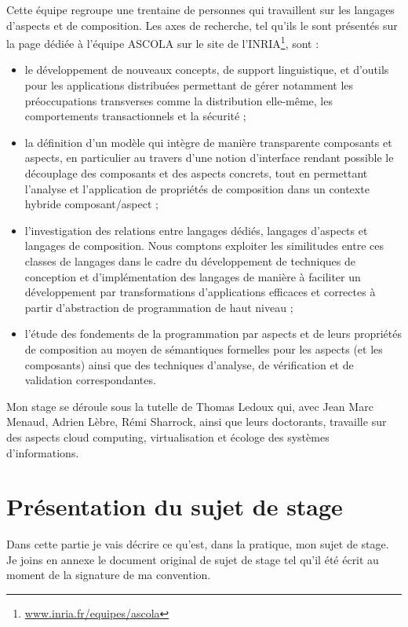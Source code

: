 \documentclass[a4paper, 11pt]{report}
\begin{document}
Cette équipe regroupe une trentaine de personnes qui travaillent sur les langages d'aspects et de composition. Les axes de recherche, tel qu'ils le sont présentés sur la page dédiée à l'équipe ASCOLA sur le site de l'INRIA\footnote{\href{http://www.inria.fr/equipes/ascola}{www.inria.fr/equipes/ascola}}, sont :
\begin{itemize}
	\item le développement de nouveaux concepts, de support linguistique, et d'outils pour les applications distribuées permettant de gérer notamment les préoccupations transverses comme la distribution elle-même, les comportements transactionnels et la sécurité ;
	\item la définition d'un modèle qui intègre de manière transparente composants et aspects, en particulier au travers d'une notion d'interface rendant possible le découplage des composants et des aspects concrets, tout en permettant l'analyse et l'application de propriétés de composition dans un contexte hybride composant/aspect ;
	\item l'investigation des relations entre langages dédiés, langages d'aspects et langages de composition. Nous comptons exploiter les similitudes entre ces classes de langages dans le cadre du développement de techniques de conception et d'implémentation des langages de manière à faciliter un développement par transformations d'applications efficaces et correctes à partir d'abstraction de programmation de haut niveau ;
	\item l'étude des fondements de la programmation par aspects et de leurs propriétés de composition au moyen de sémantiques formelles pour les aspects (et les composants) ainsi que des techniques d'analyse, de vérification et de validation correspondantes.
\end{itemize}

Mon stage se déroule sous la tutelle de Thomas Ledoux qui, avec Jean Marc Menaud, Adrien Lèbre, Rémi Sharrock, ainsi que leurs doctorants, travaille sur des aspects cloud computing, virtualisation et écologe des systèmes d'informations.

	\section{Présentation du sujet de stage}
Dans cette partie je vais décrire ce qu'est, dans la pratique, mon sujet de stage. Je joins en annexe le document original de sujet de stage tel qu'il été écrit au moment de la signature de ma convention.
\end{document}
